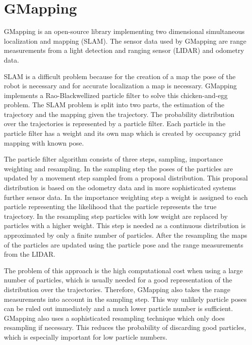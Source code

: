 \section{GMapping}

GMapping \cite{GMapping} is an open-source library implementing two dimensional simultaneous localization and mapping (SLAM). The sensor data used by GMapping are range measurements from a light detection and ranging sensor (LIDAR) and odometry data. 

SLAM is a difficult problem because for the creation of a map the pose of the robot is necessary and for accurate localization a map is necessary. GMapping implements a Rao-Blackwellized particle filter \cite{particle} to solve this chicken-and-egg problem. The SLAM problem is split into two parts, the estimation of the trajectory and the mapping given the trajectory. The probability distribution over the trajectories is represented by a particle filter. Each particle in the particle filter has a weight and its own map which is created by occupancy grid mapping with known pose. 

The particle filter algorithm consists of three steps, sampling, importance weighting and resampling. In the sampling step the poses of the particles are updated by a movement step sampled from a proposal distribution. This proposal distribution is based on the odometry data and in more sophisticated systems further sensor data. In the importance weighting step a weight is assigned to each particle representing the likelihood that the particle represents the true trajectory. In the resampling step particles with low weight are replaced by particles with a higher weight. This step is needed as a continuous distribution is approximated by only a finite number of particles. After the resampling the maps of the particles are updated using the particle pose and the range measurements from the LIDAR.

The problem of this approach is the high computational cost when using a large number of particles, which is usually needed for a good representation of the distribution over the trajectories. Therefore, GMapping also takes the range measurements into account in the sampling step. This way unlikely particle poses can be ruled out immediately and a much lower particle number is sufficient. GMapping also uses a sophisticated resampling technique which only does resampling if necessary. This reduces the probability of discarding good particles, which is especially important for low particle numbers.